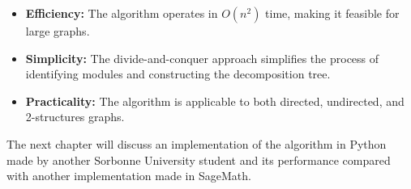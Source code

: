 \begin{itemize}
    \item \textbf{Efficiency:} The algorithm operates in $O(n^2)$ time, making it feasible for large graphs.
    \item \textbf{Simplicity:} The divide-and-conquer approach simplifies the process of identifying modules and constructing the decomposition tree.
    \item \textbf{Practicality:} The algorithm is applicable to both directed, undirected, and 2-structures graphs.
\end{itemize}


\hspace{4cm}

The next chapter will discuss an implementation of the algorithm in Python made by another Sorbonne University student and its performance compared with another implementation made in SageMath.


